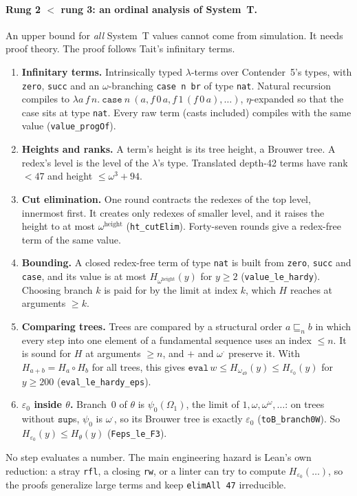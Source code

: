 \documentclass[11pt]{article}
\theoremstyle{definition}
\theoremstyle{remark}
\newcommand{\lean}[1]{\texttt{#1}}
\begin{document}
\paragraph{Rung 2 $<$ rung 3: an ordinal analysis of System~T.} An upper
bound for \emph{all} System~T values cannot come from simulation. It needs
proof theory. The proof follows Tait's infinitary terms.
\begin{enumerate}[leftmargin=*]
\item \textbf{Infinitary terms.} Intrinsically typed $\lambda$-terms over
  Contender~5's types, with \lean{zero}, \lean{succ} and an $\omega$-branching
  \lean{case n br} of type \lean{nat}. Natural recursion compiles to
  $\lambda a\,f\,n.\ \mathtt{case}\ n\ (a, f\,0\,a, f\,1\,(f\,0\,a),\dots)$,
  $\eta$-expanded so that the case sits at type \lean{nat}. Every raw term
  (casts included) compiles with the same value (\lean{value\_progOf}).
\item \textbf{Heights and ranks.} A term's height is its tree height, a
  Brouwer tree. A redex's level is the level of the $\lambda$'s type. Translated
  depth-42 terms have rank $<47$ and height $\le\omega^3+94$.
\item \textbf{Cut elimination.} One round contracts the redexes of the top
  level, innermost first. It creates only redexes of smaller level, and it
  raises the height to at most $\omega^{\text{height}}$ (\lean{ht\_cutElim}).
  Forty-seven rounds give a redex-free term of the same value.
\item \textbf{Bounding.} A closed redex-free term of type \lean{nat} is built
  from \lean{zero}, \lean{succ} and \lean{case}, and its value is at most
  $H_{\omega^{\text{height}}}(y)$ for $y\ge2$ (\lean{value\_le\_hardy}). Choosing
  branch $k$ is paid for by the limit at index $k$, which $H$ reaches at
  arguments $\ge k$.
\item \textbf{Comparing trees.} Trees are compared by a structural order
  $a\sqsubseteq_n b$ in which every step into one element of a fundamental
  sequence uses an index $\le n$. It is sound for $H$ at arguments $\ge n$,
  and $+$ and $\omega^{\cdot}$ preserve it. With $H_{a+b}=H_a\circ H_b$ for
  all trees, this gives
  $\mathtt{eval}\,w\le H_{\omega_{49}}(y)\le H_{\varepsilon_0}(y)$ for $y\ge200$
  (\lean{eval\_le\_hardy\_eps}).
\item \textbf{$\varepsilon_0$ inside $\theta$.} Branch~0 of $\theta$ is
  $\psi_0(\Omega_1)$, the limit of $1,\omega,\omega^\omega,\dots$: on trees
  without $\mathtt{sup}$s, $\psi_0$ is $\omega^{\cdot}$, so its Brouwer tree is
  exactly $\varepsilon_0$ (\lean{toB\_branch0W}). So
  $H_{\varepsilon_0}(y)\le H_\theta(y)$ (\lean{Feps\_le\_F3}).
\end{enumerate}
No step evaluates a number. The main engineering hazard is Lean's own
reduction: a stray \lean{rfl}, a closing \lean{rw}, or a linter can try to
compute $H_{\varepsilon_0}(\dots)$, so the proofs generalize large terms and
keep \lean{elimAll 47} irreducible.
\end{document}
